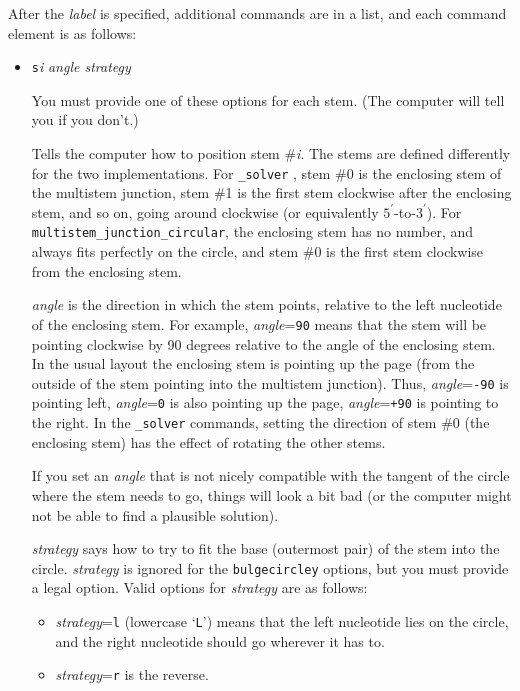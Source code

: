 \documentclass[letterpaper,12pt]{report}
\begin{document}
After the {\it label} is specified, additional commands are in a list, and each command element is as follows:
\begin{itemize}
\item {\tt s}\textit{i}  \textit{angle  strategy}

You must provide one of these options for each stem.  (The computer will
tell you if you don{\textquoteright}t.)

Tells the computer how to position stem \#\textit{i}.  The stems are
defined differently for the two implementations.  For {\tt \_solver} , stem
\#0 is the enclosing stem of the multistem junction, stem \#1 is the
first stem clockwise after the enclosing stem, and so on, going around
clockwise (or equivalently $5^\prime$-to-$3^\prime$).  For
{\tt multistem\_junction\_circular},  the enclosing stem has no number, and
always fits perfectly on the circle, and stem \#0 is the first stem
clockwise from the enclosing stem. 

\textit{angle }is the direction in which the stem points, relative to
the left nucleotide of the enclosing stem. For example,
\textit{angle}={\tt 90} means that the stem will be pointing clockwise by 90
degrees relative to the angle of the enclosing stem. In the usual
layout the enclosing stem is pointing up the page (from the outside of
the stem pointing into the multistem junction).  Thus, {\it angle}={\tt -90} is
pointing left, {\it angle}={\tt 0} is also pointing up the page, {\it angle}={\tt +90} is
pointing to the right. In the {\tt \_solver} commands, setting the direction
of stem \#0 (the enclosing stem) has the effect of rotating the other stems.

If you set an \textit{angle }that is not nicely compatible with the
tangent of the circle where the stem needs to go, things will look a
bit bad (or the computer might not be able to find a plausible
solution).  

\textit{strategy }says how to try to fit the base
(outermost pair) of the stem into the circle. \textit{strategy} is
ignored for the {\tt bulgecircley} options, but you must provide a legal
option.  Valid options for {\it strategy} are as follows:
\begin{itemize}
\item
\textit{strategy}={\tt l} (lowercase {\textquoteleft}{\tt L}{\textquoteright}) means
that the left nucleotide lies on the circle, and the right nucleotide
should go wherever it has to. 

\item\textit{strategy}={\tt r} is the reverse.  


\end{itemize}
\end{itemize}
\end{document}

